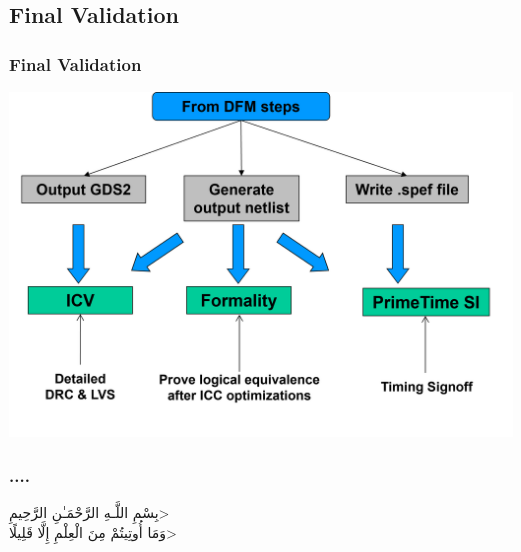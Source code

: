 \documentclass[compress]{beamer}
\begin{document}
\subsection[Validation]{Final Validation}
\begin{frame}
	\frametitle{Final Validation}
	\begin{center}
		\includegraphics[width=\textwidth]{Validation}
	\end{center}
\end{frame}
	\begin{frame}
		\frametitle{....}
		\begin{center}
			\<بِسْمِ اللَّـهِ الرَّحْمَـٰنِ الرَّحِيمِ> \\
			\<وَمَا أُوتِيتُمْ مِنَ الْعِلْمِ إِلَّا قَلِيلًا>
			
		\end{center}
	\end{frame}
\end{document}
